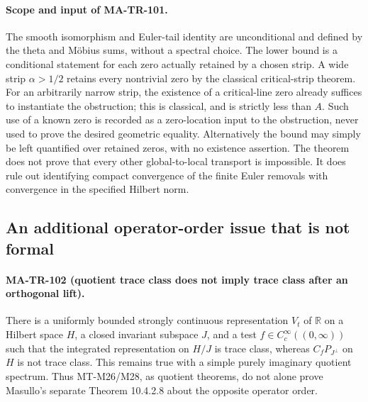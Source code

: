 \paragraph{Scope and input of MA-TR-101.}
The smooth isomorphism and Euler-tail identity are unconditional and
defined by the theta and M\"obius sums, without a spectral choice.
The lower bound is a conditional statement for each zero actually
retained by a chosen strip. A wide strip $\alpha>1/2$ retains every
nontrivial zero by the classical critical-strip theorem. For an
arbitrarily narrow strip, the existence of a critical-line zero already
suffices to instantiate the obstruction; this is classical, and is
strictly less than $A$. Such use of a known zero is recorded as a
zero-location input to the obstruction, never used to prove the
desired geometric equality. Alternatively the bound may simply be
left quantified over retained zeros, with no existence assertion.
The theorem does not prove that every other global-to-local
transport is impossible. It does rule out identifying compact
convergence of the finite Euler removals with convergence in the
specified Hilbert norm.

\subsection{An additional operator-order issue that is not formal}

\paragraph{MA-TR-102 (quotient trace class does not imply trace class after an orthogonal lift).}
There is a uniformly bounded strongly continuous representation
$V_t$ of $\mathbb R$ on a Hilbert space $H$, a closed invariant
subspace $J$, and a test $f\in C_c^\infty((0,\infty))$ such that
the integrated representation on $H/J$ is trace class, whereas
$C_fP_{J^\perp}$ on $H$ is not trace class. This remains true with
a simple purely imaginary quotient spectrum. Thus MT-M26/M28,
as quotient theorems, do not alone prove Masullo's separate
Theorem 10.4.2.8 about the opposite operator order.

